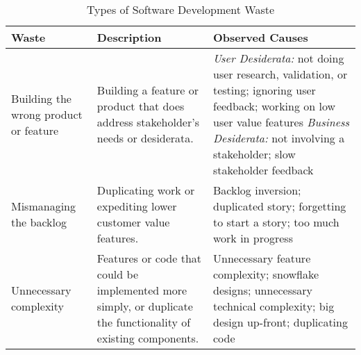 \begin{table*}[t]
\renewcommand{\arraystretch}{1.3}
\centering
\caption{Types of Software Development Waste}
\label{Waste}
\begin{tabular}{|p{1.7in}|p{2.2in}|p{3in}|}
\hline
Waste                                 & Description                                                                                                         & Observed Causes                                                                                                                                                                                                                                                                                                                                                                                                                     \\ \hline
Building the wrong product or feature & Building a feature or product that does address stakeholder's needs or desiderata.                                  & \textit{User Desiderata:} not doing user research, validation, or testing; ignoring user feedback; working on low user value features \newline \textit{Business Desiderata:} not involving a stakeholder; slow stakeholder feedback                                                                                                                                                                                  \\ \hline
Mismanaging the backlog               & Duplicating work or expediting lower customer value features.                                                       & Backlog inversion; duplicated story; forgetting to start a story; too much work in progress                                                                                                                                                                                                                                                                                                                                         \\ \hline
Unnecessary complexity  & Features or code that could be implemented more simply, or duplicate the functionality of existing components.      & Unnecessary feature complexity; snowflake designs; unnecessary technical complexity; big design up-front; duplicating code                                                                                                                                                                                                                                                                                                                \\ \hline

\end{tabular}
\end{table*}
